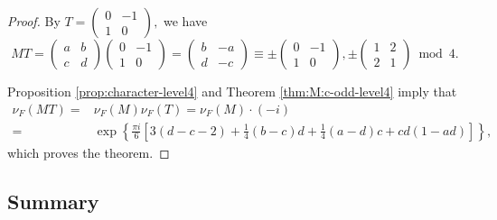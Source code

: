 \documentclass[12pt]{article}
\theoremstyle{definition}
\numberwithin{equation}{section}
\numberwithin{theorem}{section}
\begin{document}
\begin{proof}
By 
$
T
=
\begin{pmatrix}
0 & -1 \\
1 & 0
\end{pmatrix}, 
$ 
we have 
\begin{equation*}
MT
=
\begin{pmatrix}
a & b \\
c & d
\end{pmatrix}
\begin{pmatrix}
0 & -1 \\
1 & 0
\end{pmatrix}
=
\begin{pmatrix}
b & -a \\
d & -c
\end{pmatrix}
\equiv
\pm
\begin{pmatrix}
0 & -1 \\
1 & 0
\end{pmatrix},
\pm
 \begin{pmatrix}
1 & 2 \\
2 & 1
\end{pmatrix}
\bmod{4}.
\end{equation*}
\par
Proposition \ref{prop:character-level4} and Theorem \ref{thm:M:c-odd-level4}
imply that 
\begin{align*}
\nu_{F}(MT)=&\nu_{F}(M)\nu_{F}(T)=\nu_{F}(M)\cdot(-i)  \\
=&
\exp
\left\{
\frac{\pi i}{6}
\left[
3(d-c-2)+\frac14(b-c)d+\frac14(a-d)c+cd(1-ad)
\right]
\right\},
\end{align*}
which proves the theorem. 
\end{proof}











\subsection{Summary}
\end{document}
